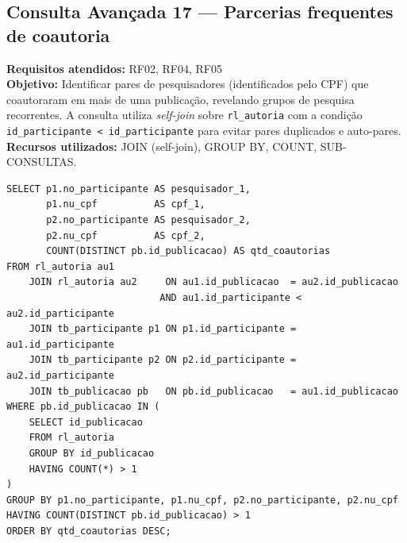 \documentclass[12pt]{article}
\begin{document}
\subsection{Consulta Avançada 17 --- Parcerias frequentes de coautoria}
\textbf{Requisitos atendidos:} RF02, RF04, RF05 \\
\textbf{Objetivo:} Identificar pares de pesquisadores (identificados pelo CPF) que coautoraram em mais de uma publicação, revelando grupos de pesquisa recorrentes. A consulta utiliza \emph{self-join} sobre \texttt{rl\_autoria} com a condição \texttt{id\_participante < id\_participante} para evitar pares duplicados e auto-pares. \\
\textbf{Recursos utilizados:} JOIN (self-join), GROUP BY, COUNT, SUB-CONSULTAS.
\begin{lstlisting}[caption={QA17 --- Parcerias frequentes de coautoria (pares com >1 publicação em comum).}]
SELECT p1.no_participante AS pesquisador_1,
       p1.nu_cpf          AS cpf_1,
       p2.no_participante AS pesquisador_2,
       p2.nu_cpf          AS cpf_2,
       COUNT(DISTINCT pb.id_publicacao) AS qtd_coautorias
FROM rl_autoria au1
    JOIN rl_autoria au2     ON au1.id_publicacao  = au2.id_publicacao
                           AND au1.id_participante < au2.id_participante
    JOIN tb_participante p1 ON p1.id_participante = au1.id_participante
    JOIN tb_participante p2 ON p2.id_participante = au2.id_participante
    JOIN tb_publicacao pb   ON pb.id_publicacao   = au1.id_publicacao
WHERE pb.id_publicacao IN (
    SELECT id_publicacao
    FROM rl_autoria
    GROUP BY id_publicacao
    HAVING COUNT(*) > 1
)
GROUP BY p1.no_participante, p1.nu_cpf, p2.no_participante, p2.nu_cpf
HAVING COUNT(DISTINCT pb.id_publicacao) > 1
ORDER BY qtd_coautorias DESC;
\end{lstlisting}
\end{document}

